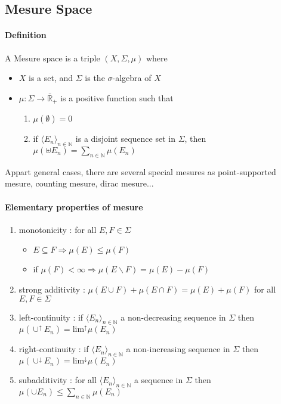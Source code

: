 \documentclass[a4paper,10pt]{article}
\begin{document}
\subsection{Mesure Space}
\paragraph{Definition} A Mesure space is a triple $(X,\Sigma,\mu)$ where
\begin{itemize}
 \item $X$ is a set, and $\Sigma$ is the $\sigma$-algebra of $X$
 \item $\mu : \Sigma \longrightarrow \bar{\mathbb{R}}_{+}$ is a positive function such that
 \begin{enumerate}
  \item $\mu(\emptyset) = 0$
  \item if $\langle E_{n} \rangle_{n \in \mathbb{N}}$ is a disjoint sequence set in $\Sigma$, then $\mu(\uplus E_{n}) = \sum_{n \in \mathbb{N}}\mu(E_n) $
 \end{enumerate}
\end{itemize}
Appart general cases, there are several special mesures as point-supported mesure, counting mesure, dirac mesure...

\paragraph{Elementary properties of mesure}
\begin{enumerate}
 \item monotonicity : for all $E,F \in \Sigma$ 
 \begin{itemize}
  \item $E \subseteq F \Longrightarrow \mu(E) \leq \mu(F)$
  \item if $\mu(F) < \infty  \Longrightarrow \mu(E\backslash F) = \mu(E) - \mu(F)$
 \end{itemize}

 \item strong additivity : $\mu(E\cup F) + \mu(E\cap F) = \mu(E) + \mu(F)$ for all $E,F \in \Sigma$ 
 \item left-continuity : if $\langle E_{n} \rangle_{n \in \mathbb{N}}$ a non-decreasing sequence in $\Sigma$ then 
 $\mu(\cup^{\uparrow} E_{n}) = \text{lim}^{\uparrow} \mu(E_{n})$
 \item right-continuity : if $\langle E_{n} \rangle_{n \in \mathbb{N}}$ a non-increasing sequence in $\Sigma$ then 
 $\mu(\cup^{\downarrow} E_{n}) = \text{lim}^{\downarrow} \mu(E_{n})$
 \item subadditivity : for all $\langle E_{n} \rangle_{n \in \mathbb{N}}$ a sequence in $\Sigma$ then $\mu(\cup E_{n}) \leq \sum_{n \in \mathbb{N}}\mu(E_n) $
\end{enumerate}
\end{document}
